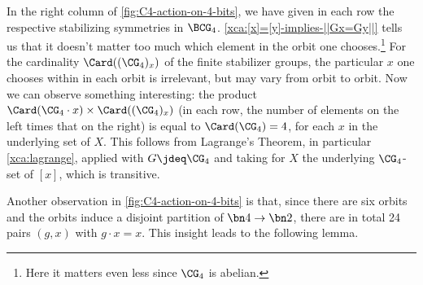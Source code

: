 \begin{example}
In the right column of \cref{fig:C4-action-on-4-bits}, we have
given in each row the respective stabilizing symmetries in $\BCG_4$.
\cref{xca:[x]=[y]-implies-||Gx=Gy||} tells us that it doesn't matter
too much which element in the orbit one chooses.\footnote{%
  Here it matters even less since $\CG_4$ is abelian.}
For the cardinality $\Card((\CG_4)_x)$ of the finite stabilizer groups, 
the particular $x$ one chooses within in each orbit is irrelevant,
but may vary from orbit to orbit. Now we can observe something
interesting: the product $\Card({\CG_4}\cdot {x}) \times \Card((\CG_4)_x)$
(\ie in each row, the number of elements on the left times that on the right)
is equal to $\Card(\CG_4) = 4$, for each $x$ in the underlying set of $X$.
This follows from Lagrange's Theorem, in particular \cref{xca:lagrange},
applied with $G\jdeq\CG_4$ and taking for $X$ the underlying $\CG_4$-set
of $[x]$, which is transitive.

Another observation in \cref{fig:C4-action-on-4-bits} is that, 
since there are six orbits and the orbits induce a disjoint partition
of $\bn4\to\bn2$, there are in total 24 pairs $(g,x)$ with $g\cdot x = x$.
This insight leads to the following lemma.
\end{example}


